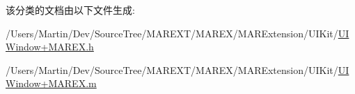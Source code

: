 该分类的文档由以下文件生成\+:\begin{DoxyCompactItemize}
\item 
/\+Users/\+Martin/\+Dev/\+Source\+Tree/\+M\+A\+R\+E\+X\+T/\+M\+A\+R\+E\+X/\+M\+A\+R\+Extension/\+U\+I\+Kit/\hyperlink{_u_i_window_09_m_a_r_e_x_8h}{U\+I\+Window+\+M\+A\+R\+E\+X.\+h}\item 
/\+Users/\+Martin/\+Dev/\+Source\+Tree/\+M\+A\+R\+E\+X\+T/\+M\+A\+R\+E\+X/\+M\+A\+R\+Extension/\+U\+I\+Kit/\hyperlink{_u_i_window_09_m_a_r_e_x_8m}{U\+I\+Window+\+M\+A\+R\+E\+X.\+m}\end{DoxyCompactItemize}

